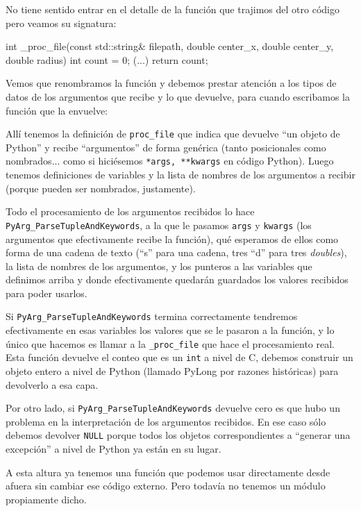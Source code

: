 No tiene sentido entrar en el detalle de la función que trajimos del otro código pero veamos su signatura:

\begin{cpp}
int _proc_file(const std::string& filepath, double center_x, double center_y, double radius) {
    int count = 0;
    (...)
    return count;
}
\end{cpp}

Vemos que renombramos la función y debemos prestar atención a los tipos de datos de los argumentos que recibe y lo que devuelve, para cuando escribamos la función que la envuelve:


Allí tenemos la definición de \texttt{proc\_file} que indica que devuelve ``un objeto de Python'' y recibe ``argumentos'' de forma genérica (tanto posicionales como nombrados... como si hiciésemos \texttt{*args, **kwargs} en código Python). Luego tenemos definiciones de variables y la lista de nombres de los argumentos a recibir (porque pueden ser nombrados, justamente).

Todo el procesamiento de los argumentos recibidos lo hace \texttt{PyArg\_ParseTupleAndKeywords}, a la que le pasamos \texttt{args} y \texttt{kwargs} (los argumentos que efectivamente recibe la función), qué esperamos de ellos como forma de una cadena de texto (``s'' para una cadena, tres ``d'' para tres \textit{doubles}), la lista de nombres de los argumentos, y los punteros a las variables que definimos arriba y donde efectivamente quedarán guardados los valores recibidos para poder usarlos.

Si \texttt{PyArg\_ParseTupleAndKeywords} termina correctamente tendremos efectivamente en esas variables los valores que se le pasaron a la función, y lo único que hacemos es llamar a la \texttt{\_proc\_file} que hace el procesamiento real. Esta función devuelve el conteo que es un \texttt{int} a nivel de C, debemos construir un objeto entero a nivel de Python (llamado PyLong por razones históricas) para devolverlo a esa capa.

Por otro lado, si \texttt{PyArg\_ParseTupleAndKeywords} devuelve cero es que hubo un problema en la interpretación de los argumentos recibidos. En ese caso sólo debemos devolver \texttt{NULL} porque todos los objetos correspondientes a ``generar una excepción'' a nivel de Python ya están en su lugar.

A esta altura ya tenemos una función que podemos usar directamente desde afuera sin cambiar ese código externo. Pero todavía no tenemos un módulo propiamente dicho.

